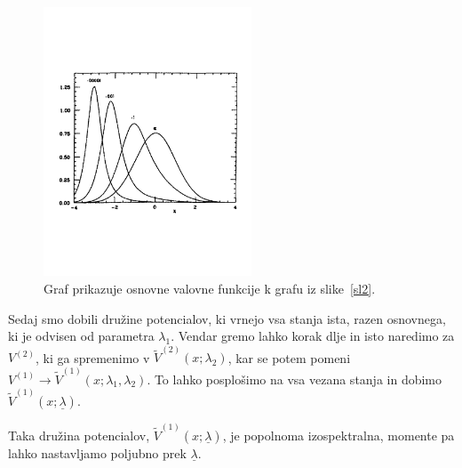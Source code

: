 \begin{figure}[H]
	\centering
	\includegraphics[height=8cm, keepaspectratio=1, trim=0cm 7cm 0cm 7cm]{pics/slika4}
	\caption{Graf prikazuje osnovne valovne funkcije k grafu iz slike~\ref{sl2}.}
	\label{sl3}
\end{figure}

Sedaj smo dobili dru\v zine potencialov, ki vrnejo vsa stanja ista, razen osnovnega, ki je odvisen od parametra $\lambda_1$.
Vendar gremo lahko korak dlje in isto naredimo za $V^{(2)}$, ki ga spremenimo v $\tilde{V}^{(2)}(x; \lambda_2)$, kar se potem
pomeni $V^{(1)} \to \tilde{V}^{(1)} (x; \lambda_1, \lambda_2)$. To lahko posplo\v simo na vsa vezana stanja in dobimo $\tilde{V}
^{(1)}(x; \underline{\lambda})$.

Taka dru\v zina potencialov, $\tilde{V}^{(1)}(x;\underline{\lambda})$, je popolnoma izospektralna, momente pa lahko nastavljamo
poljubno prek $\underline{\lambda}$.

